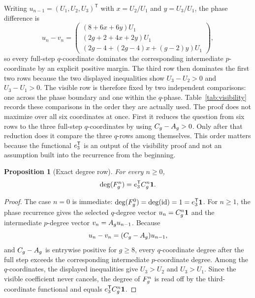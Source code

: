 \documentclass[11pt]{article}
\newtheorem{proposition}[theorem]{Proposition}
\theoremstyle{remark}
\numberwithin{equation}{section}
\begin{document}
Writing \(u_{n-1}=(U_1,U_2,U_3)^{\mathsf T}\) with \(x=U_2/U_1\) and
\(y=U_3/U_1\), the phase difference is
\[
u_n-v_n=
\begin{pmatrix}
(8+6x+6y)U_1\\
(2g+2+4x+2y)U_1\\
(2g-4+(2g-4)x+(g-2)y)U_1
\end{pmatrix},
\]
so every full-step \(q\)-coordinate dominates the corresponding intermediate
\(p\)-coordinate by an explicit positive margin.  The third row then dominates
the first two rows because the two displayed inequalities show \(U_3-U_2>0\)
and \(U_3-U_1>0\).  The visible row is therefore fixed by two independent
comparisons: one across the phase boundary and one within the \(q\)-phase.
Table~\ref{tab:visibility} records these comparisons in the order they are
actually used.  The proof does not maximize over all six coordinates at once.
First it reduces the question from six rows to the three full-step
\(q\)-coordinates by using \(C_g-A_g>0\).  Only after that reduction does it
compare the three \(q\)-rows among themselves.  This order matters because the
functional \(e_3^{\mathsf T}\) is an output of the visibility proof and not
an assumption built into the recurrence from the beginning.

\begin{proposition}[Exact degree row]\label{prop:degree}
For every \(n\geq 0\),
\[
\operatorname{deg}(F_g^n)=e_3^{\mathsf T}C_g^n\mathbf{1}.
\]
\end{proposition}

\begin{proof}
The case \(n=0\) is immediate:
\(\operatorname{deg}(F_g^0)=\operatorname{deg}(\operatorname{id})=1=e_3^{\mathsf T}\mathbf{1}\).  For \(n\geq 1\), the
phase recurrence gives the selected \(q\)-degree vector \(u_n=C_g^n\mathbf{1}\) and the
intermediate \(p\)-degree vector \(v_n=A_g u_{n-1}\).  Because
\[
u_n-v_n=(C_g-A_g)u_{n-1},
\]
and \(C_g-A_g\) is entrywise positive for \(g\geq 8\), every \(q\)-coordinate
degree after the full step exceeds the corresponding intermediate
\(p\)-coordinate degree.  Among the \(q\)-coordinates, the displayed
inequalities give \(U_3>U_2\) and \(U_3>U_1\).  Since the visible coefficient
never cancels, the degree of \(F_g^n\) is read off by the third-coordinate
functional and equals \(e_3^{\mathsf T}C_g^n\mathbf{1}\).
\end{proof}
\end{document}
